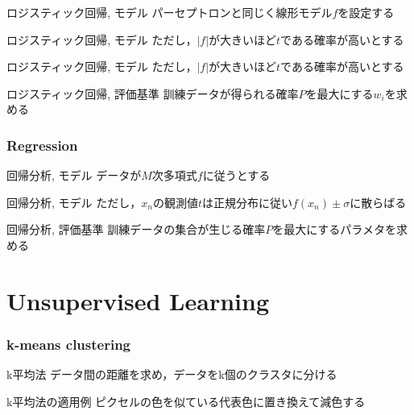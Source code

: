 \documentclass[dvipdfmx,platex]{beamer}
\begin{document}
\begin{frame}{ロジスティック回帰, モデル}
  パーセプトロンと同じく線形モデル$f$を設定する
\end{frame}
\begin{frame}{ロジスティック回帰, モデル}
  ただし，$|f|$が大きいほど$t$である確率が高いとする
\end{frame}
\begin{frame}{ロジスティック回帰, モデル}
  ただし，$|f|$が大きいほど$t$である確率が高いとする
\end{frame}
\begin{frame}{ロジスティック回帰, 評価基準}
  訓練データが得られる確率$P$を最大にする$w_i$を求める
\end{frame}
\section{Regression}
\begin{frame}{回帰分析, モデル}
  データが$M$次多項式$f$に従うとする
\end{frame}
\begin{frame}{回帰分析, モデル}
  ただし，$x_n$の観測値$t$は正規分布に従い$f(x_n)\pm\sigma$に散らばる  
\end{frame}
\begin{frame}{回帰分析, 評価基準}
  訓練データの集合が生じる確率$P$を最大にするパラメタを求める
\end{frame}
\part{Unsupervised Learning}
\section{k-means clustering}
\begin{frame}{k平均法}
  データ間の距離を求め，データをk個のクラスタに分ける
\end{frame}
\begin{frame}{k平均法の適用例}
  ピクセルの色を似ている代表色に置き換えて減色する
\end{frame}
\end{document}

